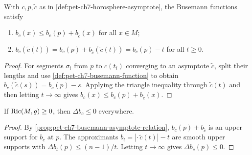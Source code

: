 \begin{proposition}
  \label{prop:pet-ch7-busemann-asymptote-relation}

  With $c,p,\tilde c$ as in \cref{def:pet-ch7-horosphere-asymptote}, the
  Busemann functions satisfy
  \begin{enumerate}
    \item[(1)] $b_c(x)\le b_c(p)+b_{\tilde c}(x)$ for all $x\in M$;
    \item[(2)] $b_c(\tilde c(t))=b_c(p)+b_{\tilde c}(\tilde c(t))=b_c(p)-t$ for
      all $t\ge0$.
  \end{enumerate}
\end{proposition}
\begin{proof}
  \sketch
  For segments \(\sigma_i\) from \(p\) to \(c(t_i)\) converging to an asymptote \(\widetilde c\), split their lengths and use \cref{def:pet-ch7-busemann-function} to obtain \(b_c(\widetilde c(s))=b_c(p)-s\). Applying the triangle inequality through \(\widetilde c(t)\) and then letting \(t\to\infty\) gives \(b_c(x)\le b_c(p)+b_{\widetilde c}(x)\).
\end{proof}

\begin{lemma}
  \label{lem:pet-ch7-busemann-superharmonic}

  If $\operatorname{Ric}(M,g)\ge0$, then $\Delta b_c\le0$ everywhere.
\end{lemma}
\begin{proof}
  \sketch
  By \cref{prop:pet-ch7-busemann-asymptote-relation}, \(b_c(p)+b_{\widetilde c}\) is an upper support for \(b_c\) at \(p\). The approximants \(b_t=|\cdot\,\widetilde c(t)|-t\) are smooth upper supports with \(\Delta b_t(p)\le(n-1)/t\). Letting \(t\to\infty\) gives \(\Delta b_c(p)\le0\).
\end{proof}


